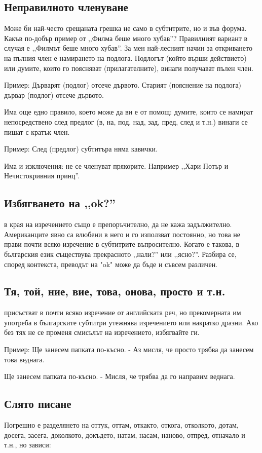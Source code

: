 \subsection{Неправилното членуване}
Може би най-често срещаната грешка не само в субтитрите, но и във форума. Какъв по-добър пример от ,,Филма беше много хубав''? Правилният вариант в случая е ,,Филмът беше много хубав''. За мен най-лесният начин за откриването на пълния член е намирането на подлога. Подлогът (който върши действието) или думите, които го поясняват (прилагателните), винаги получават пълен член.

Пример:
Дърварят (подлог) отсече дървото.
Старият (пояснение на подлога) дървар (подлог) отсече дървото.

Има още едно правило, което може да ви е от помощ: думите, които се намират непосредствено след предлог (в, на, под, над, зад, пред, след и т.н.) винаги се пишат с кратък член.

Пример:
След (предлог) субтитъра няма кавички.

Има и изключения: не се членуват прякорите. Например ,,Хари Потър и Нечистокривния принц''.

\subsection{Избягването на ,,ok?''}
в края на изречението също е препоръчително, да не кажа задължително. Американците явно са влюбени в него и го използват постоянно, но това не прави почти всяко изречение в субтитрите въпросително. Когато е такова, в българския език съществува прекрасното ,,нали?'' или ,,ясно?''. Разбира се, според контекста, преводът на "ok" може да бъде и съвсем различен.

\subsection{Тя, той, ние, вие, това, онова, просто и т.н.}
присъстват в почти всяко изречение от английската реч, но прекомерната им употреба в българските субтитри утежнява изречението или накратко дразни. Ако без тях не се променя смисълът на изречението, избягвайте ги.

Пример:
Ще занесем папката по-късно.
- Аз мисля, че просто трябва да занесем това веднага.

Ще занесем папката по-късно.
- Мисля, че трябва да го направим веднага.

\subsection{Слято писане}
Погрешно е разделянето на оттук, оттам, откакто, откога, отколкото, дотам, досега, засега, доколкото, докъдето, натам, насам, наново, отпред, отначало и т.н., но зависи:

